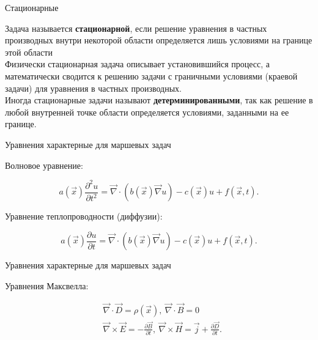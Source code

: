 \documentclass[10pt,xcolor=pst,aspectratio=169]{beamer}
\begin{document}
\begin{frame}{Стационарные}

	\transdissolve[duration=0.1]
	\justifying
	\large

	Задача называется \textbf{стационарной}, если решение уравнения в частных производных внутри некоторой области определяется лишь условиями на границе этой области\\

	Физически стационарная задача описывает установившийся процесс, а математически сводится к решению задачи с граничными условиями (краевой задачи) для уравнения в частных производных.\\

	Иногда стационарные задачи называют \textbf{детерминированными}, так как решение в любой внутренней точке области определяется условиями, заданными на ее границе.

\end{frame}

\begin{frame}{Уравнения характерные для маршевых задач}

	\transdissolve[duration=0.1]
	\justifying
	\large

    Волновое уравнение:

	\[
		a(\vec{x}) \frac{\partial^{2} u}{\partial t^{2}} = \vec{\nabla} \cdot \left( b(\vec{x}) \vec{\nabla} u \right) - c(\vec{x}) u + f(\vec{x}, t).
	\]

	Уравнение теплопроводности (диффузии):

	\[
		a(\vec{x}) \frac{\partial u}{\partial t} = \vec{\nabla} \cdot \left( b(\vec{x}) \vec{\nabla} u \right) - c(\vec{x}) u + f(\vec{x}, t).
	\]

\end{frame}

\begin{frame}{Уравнения характерные для маршевых задач}

	\transdissolve[duration=0.1]
	\justifying
	\large

	Уравнения Максвелла:

	\[
		\begin{split}
			&\vec{\nabla} \cdot \vec{D} = \rho (\vec{x}), \:
			\vec{\nabla} \cdot \vec{B} = 0 \\ 
			&\vec{\nabla} \times \vec{E} = - \frac{\partial \vec{B}}{\partial t}, \:
			\vec{\nabla} \times \vec{H} = \vec{j} + \frac{\partial \vec{D}}{\partial t}.
		\end{split}
	\]

\end{frame}
\end{document}
